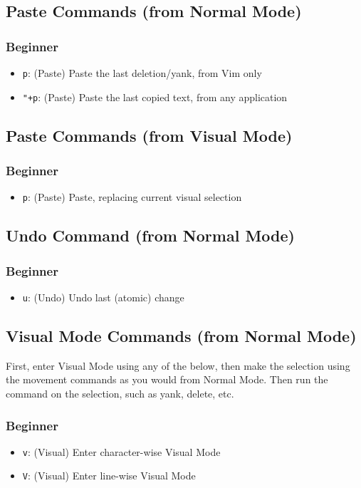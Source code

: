 \documentclass[11pt]{article}
\begin{document}
\subsection{Paste Commands (from Normal Mode)}
\label{sec:org6819a8a}
\subsubsection{Beginner}
\label{sec:org2b9e6d9}
\begin{itemize}
\item \texttt{p}: (Paste) Paste the last deletion/yank, from Vim only
\item \texttt{"+p}: (Paste) Paste the last copied text, from any application
\end{itemize}
\subsection{Paste Commands (from Visual Mode)}
\label{sec:org7afe984}
\subsubsection{Beginner}
\label{sec:org96b5300}
\begin{itemize}
\item \texttt{p}: (Paste) Paste, replacing current visual selection
\end{itemize}
\subsection{Undo Command (from Normal Mode)}
\label{sec:orgab943ea}
\subsubsection{Beginner}
\label{sec:orgc4bdde9}
\begin{itemize}
\item \texttt{u}: (Undo) Undo last (atomic) change
\end{itemize}
\subsection{Visual Mode Commands (from Normal Mode)}
\label{sec:org4facaf4}
First, enter Visual Mode using any of the below, then make the selection using
the movement commands as you would from Normal Mode. Then run the command on the
selection, such as yank, delete, etc.
\subsubsection{Beginner}
\label{sec:org13c1009}
\begin{itemize}
\item \texttt{v}: (Visual) Enter character-wise Visual Mode
\item \texttt{V}: (Visual) Enter line-wise Visual Mode
\end{itemize}
\end{document}
